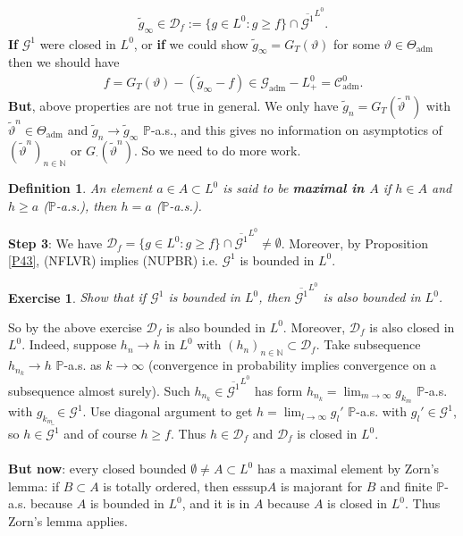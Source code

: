 \documentclass[12pt,a4paper, twoside]{article}
\newtheorem{defn}{Definition}[section]
\newtheorem{exe}{Exercise}[section]
\theoremstyle{definition}
\newcommand{\PP}{\mathbb{P}} %
\begin{document}
\begin{align*}
\widetilde{g}_\infty \in \mathcal{D}_f:= \{ g \in L^0: g \geq f\} \cap \overline{\mathcal{G}^1}^{L^0}.
\end{align*}
\textbf{If} $\mathcal{G}^1$ were closed in $L^0$, or \textbf{if} we could show $\widetilde{g}_\infty = G_T( \vartheta)$ for some $\vartheta \in \Theta_\text{adm}$ then we should have 
\begin{align*}
f= G_T( \vartheta)- ( \widetilde{g}_\infty -f) \in \mathcal{G}_\text{adm}-L_+^0= \mathcal{C}_\text{adm}^0.
\end{align*}
\textbf{But}, above properties are not true in general. We only have $\widetilde{g}_n = G_T( \widetilde{\vartheta}^n)$ with $\widetilde{\vartheta}^n \in \Theta_\text{adm}$ and $\widetilde{g}_n \to \widetilde{g}_\infty$ $\PP$-a.s., and this gives no information on asymptotics of $( \widetilde{\vartheta}^n)_{n \in \mathbb{N}}$ or $G_\cdot ( \widetilde{\vartheta}^n)$. So we need to do more work. 
\newpage
\begin{defn} An element $a \in A \subset L^0$ is said to be \textbf{maximal in $A$} if $h \in A$ and $h \geq a$ ($\PP$-a.s.), then $h=a$ ($\PP$-a.s.).
\end{defn}
\noindent \textbf{Step 3}: We have $\mathcal{D}_f = \{ g \in L^0: g \geq f \} \cap \overline{ \mathcal{G}^1}^{L^0} \neq \emptyset$. Moreover, by Proposition \ref{P43}, (NFLVR) implies (NUPBR) i.e. $\mathcal{G}^1$ is bounded in $L^0$. 
\begin{exe} Show that if $\mathcal{G}^1$ is bounded in $L^0$, then $\overline{\mathcal{G}^1}^{L^0}$ is also bounded in $L^0$.
\end{exe}
\noindent So by the above exercise $\mathcal{D}_f$ is also bounded in $L^0$. Moreover, $\mathcal{D}_f$ is also closed in $L^0$. Indeed, suppose $h_n \to h$ in $L^0$ with $(h_n)_{n \in \mathbb{N}} \subset \mathcal{D}_f$. Take subsequence $h_{n_k} \to h$ $\PP$-a.s. as $k \to \infty$ (convergence in probability implies convergence on a subsequence almost surely). Such $h_{n_k} \in \overline{\mathcal{G}^1}^{L^0}$ has form $h_{n_k} = \lim_{m \to \infty} g_{k_m}$ $\PP$-a.s. with $g_{k_m} \in \mathcal{G}^1$. Use diagonal argument to get $h = \lim_{l \to \infty} g_l'$ $\PP$-a.s. with $g_l' \in \mathcal{G}^1$, so $h \in \overline{\mathcal{G}^1}$ and of course $h \geq f$. Thus $h \in \mathcal{D}_f$ and $\mathcal{D}_f$ is closed in $L^0$. 
\\\\
\textbf{But now}: every closed bounded $\emptyset \neq A \subset L^0$ has a maximal element by Zorn's lemma: if $B \subset A$ is totally ordered, then esssup$A$ is majorant for $B$ and finite $\PP$-a.s. because $A$ is bounded in $L^0$, and it is in $A$ because $A$ is closed in $L^0$. Thus Zorn's lemma applies. 
\end{document}
